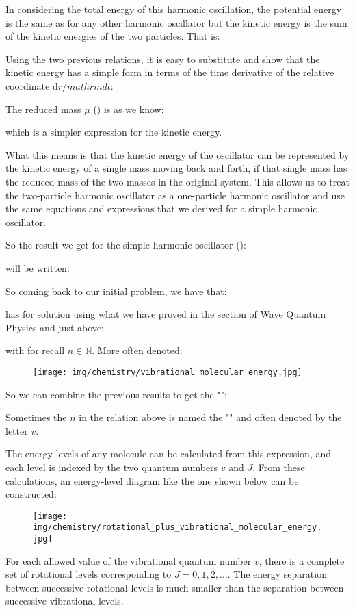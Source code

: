 	In considering the total energy of this harmonic oscillation, the potential energy 	is the same as for any other harmonic oscillator but the kinetic energy is the sum of 	the kinetic energies of the two particles. That is:
	
	Using the two previous relations, it is easy to substitute and show that the kinetic energy has a simple form in terms of the time derivative of the relative coordinate $\mathrm{d}r/mathrm{d}t$:
	
	The reduced mass $\mu$ () is as we know:
	
	which is a simpler expression for the kinetic energy.
	
	What this means is that the kinetic energy of the oscillator can be represented by the kinetic energy of a single mass moving back and forth, if that single mass has the reduced mass of the two masses in the original system. This allows us to treat the two-particle harmonic oscillator as a one-particle harmonic oscillator and use the same equations and expressions that we derived for a simple harmonic oscillator.
	
	So the result we get for the simple harmonic oscillator ():
	
	will be written:
	
	So coming back to our initial problem, we have that:
	
	has for solution using what we have proved in the section of Wave Quantum Physics and just above:
	
	with for recall $n\in \mathbb{N}$. More often denoted:
	
		\begin{figure}[H]
		\centering
		\texttt{[image: img/chemistry/vibrational\_molecular\_energy.jpg]}
	\end{figure}
	So we can combine the previous results to get the "":
	
	Sometimes the $n$ in the relation above is named the "" and often denoted by the letter $v$.
	
	The energy levels of any molecule can be calculated from this expression, and each
level is indexed by the two quantum numbers $v$ and $J$. From these calculations, an
energy-level diagram like the one shown below can be constructed:
	\begin{figure}[H]
		\centering
		\texttt{[image: img/chemistry/rotational\_plus\_vibrational\_molecular\_energy.jpg]}
	\end{figure}
	For each allowed value of the vibrational quantum number $v$, there is a complete set of rotational levels corresponding to $J=0,1,2,\ldots$. The energy separation between successive rotational levels is much smaller than the separation between successive vibrational levels.

